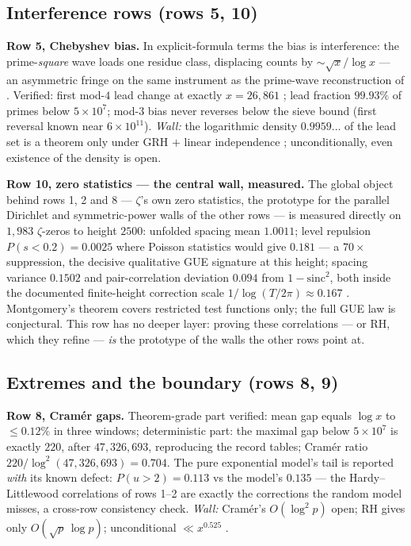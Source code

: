 \documentclass[11pt]{article}
\theoremstyle{remark}
\begin{document}
\subsection{Interference rows (rows 5, 10)}

\textbf{Row 5, Chebyshev bias.} In explicit-formula terms the bias is
interference: the prime-\emph{square} wave loads one residue class,
displacing counts by $\sim\sqrt x/\log x$ --- an asymmetric fringe on the
same instrument as the prime-wave reconstruction of \cite{Diffraction}.
Verified: first mod-$4$ lead change at exactly $x=26{,}861$ \cite{Leech};
lead fraction $99.93\%$ of primes below $5\times10^7$; mod-$3$ bias never
reverses below the sieve bound (first reversal known near $6\times10^{11}$).
\emph{Wall:} the logarithmic density $0.9959\ldots$ of the lead set is a
theorem only under GRH $+$ linear independence \cite{RubinsteinSarnak};
unconditionally, even existence of the density is open.

\textbf{Row 10, zero statistics --- the central wall, measured.} The
global object behind rows 1, 2 and 8 --- $\zeta$'s own zero statistics,
the prototype for the parallel Dirichlet and symmetric-power walls of the
other rows --- is measured directly on $1{,}983$ $\zeta$-zeros to height
$2500$: unfolded spacing mean $1.0011$; level repulsion
$P(s<0.2)=0.0025$ where Poisson statistics would give $0.181$ --- a
$70\times$ suppression, the decisive qualitative GUE signature at this
height; spacing variance $0.1502$ and pair-correlation deviation $0.094$
from $1-\mathrm{sinc}^2$, both inside the documented finite-height
correction scale $1/\log(T/2\pi)\approx0.167$ \cite{Berry,Odlyzko}.
Montgomery's theorem \cite{Montgomery} covers restricted test functions
only; the full GUE law is conjectural. This row has no deeper layer:
proving these correlations --- or RH, which they refine --- \emph{is} the
prototype of the walls the other rows point at.

\subsection{Extremes and the boundary (rows 8, 9)}

\textbf{Row 8, Cram\'er gaps.} Theorem-grade part verified: mean gap equals
$\log x$ to $\le0.12\%$ in three windows; deterministic part: the maximal
gap below $5\times10^7$ is exactly $220$, after $47{,}326{,}693$, reproducing
the record tables; Cram\'er ratio $220/\log^2(47{,}326{,}693)=0.704$. The
pure exponential model's tail is reported \emph{with} its known defect:
$P(u>2)=0.113$ vs the model's $0.135$ --- the Hardy--Littlewood correlations
of rows 1--2 are exactly the corrections the random model misses, a
cross-row consistency check. \emph{Wall:} Cram\'er's $O(\log^2 p)$ open;
RH gives only $O(\sqrt p\,\log p)$; unconditional
$\ll x^{0.525}$ \cite{BHP}.
\end{document}
